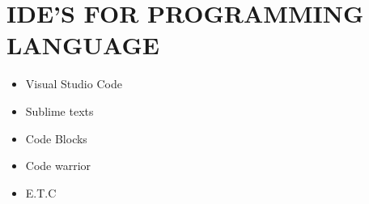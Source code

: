 \documentclass{article}
\begin{document}
	\section*{IDE'S FOR PROGRAMMING LANGUAGE}
	\begin{itemize}
		\item Visual Studio Code
		\item Sublime texts
		\item Code Blocks
		\item Code warrior
		\item E.T.C
	\end{itemize}
\end{document}
